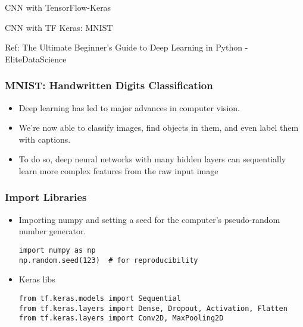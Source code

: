 \begin{frame}
  \begin{center}
    {\Large CNN with TensorFlow-Keras}
    
  \end{center}
\end{frame}

\begin{frame}
  \begin{center}
    {\Large CNN with TF Keras: MNIST}
    
    {Ref: The Ultimate Beginner's Guide to Deep Learning in Python - EliteDataScience}
  \end{center}
\end{frame}

\begin{frame}[fragile] \frametitle{MNIST: Handwritten Digits Classification}
\begin{itemize}
\item Deep learning has led to major advances in computer vision. 
\item We're now able to classify images, find objects in them, and even label them with captions. 
\item To do so, deep neural networks with many hidden layers can sequentially learn more complex features from the raw input image
\end{itemize}
\end{frame}

\begin{frame}[fragile] \frametitle{Import Libraries}

\begin{itemize}
\item Importing numpy and setting a seed for the computer's pseudo-random number generator.
\begin{lstlisting}
import numpy as np
np.random.seed(123)  # for reproducibility
\end{lstlisting}
\item Keras libs
\begin{lstlisting}
from tf.keras.models import Sequential
from tf.keras.layers import Dense, Dropout, Activation, Flatten
from tf.keras.layers import Conv2D, MaxPooling2D
\end{lstlisting}
\end{itemize}
\end{frame}

